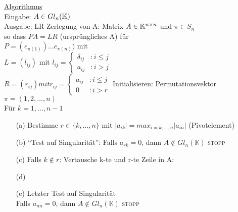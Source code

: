 \underline{Algorithmus} \\
Eingabe: $A \in Gl_n (\mathbb K)$ \\
Ausgabe: LR-Zerlegung von A:  Matrix $ A \in \mathbb K^{n \times n}$ und
$\pi \in S_n$ \\
so dass $PA = LR$ (ursprüngliches A) für \\
$P = (e_{\pi(1)}) \dots e_{\pi(n)})$ mit \\
$L = (l_{ij}) \text{ mit } l_{ij} =
\begin{cases} \delta_{ij} &: i \le j \\  a_{ij} &: i > j  \end{cases} $ \\
$R = (r_{ij}) mit r_{ij} =
\begin{cases} a_{ij} &: i \le j \\ 0 &: i > r  \end{cases}$
Initialisieren: Permutationsvektor $\pi = (1,2, \dots, n)$\\
Für $k = 1, \dots, n-1$ \\

\begin{enumerate}
\item[(a)] Bestimme $r \in \{k, \dots, n \} $ mit $ |a_{ik}|
= max_{i= k, \dots, n} |a_{in}|$ (Pivotelement)
\item[(b)] "`Test auf Singularität"': Falls $a_{rk}=0$, 
	dann $A \notin Gl_n(\mathbb{K})$ \textsc{stopp}
\item[(c)] 
Falls $k \notin r$: Vertausche k-te und r-te Zeile in A:

\begin{algorithm}
\begin{algorithmic}

\State {}
\EndFunction
\end{algorithmic}
\end{algorithm}

\item[(d)] 
\item[(e)]
Letzter Test auf Singularität\\
Falls $a_{nn}=0$, dann $A \notin Gl_n(\mathbb{K})$ \textsc{stopp}
\end{enumerate}

